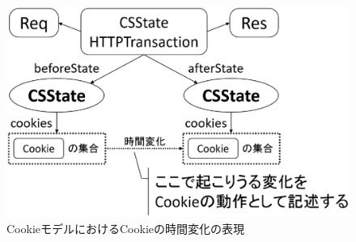 \documentclass[12pt,a4paper]{jbook}
\begin{document}
\begin{figure}[htb]
\centering
\includegraphics[width=450pt]{./fig/cookie-model-transaction.eps}
\caption{CookieモデルにおけるCookieの時間変化の表現}
\label{fig:cookie-model-transaction}
\end{figure}
\color{black}
\end{document}
